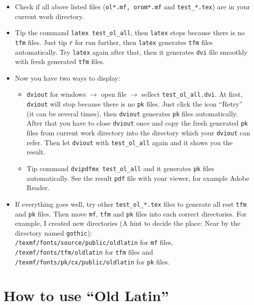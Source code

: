 \documentclass[a4paper]{article}
\begin{document}
\begin{itemize}
\item
Check if all above listed files
(\texttt{ol*.mf, orom*.mf} and \texttt{test\_*.tex})
are in your current work directory.
\item
Tip the command \texttt{latex test\_ol\_all},
then \texttt{latex} stops because there is no \texttt{tfm} files.
Just tip \texttt{r} for run further,
then \texttt{latex} generates \texttt{tfm} files automatically.
Try \texttt{latex} again after that,
then it generates \texttt{dvi} file smoothly
with fresh generated \texttt{tfm} files.

\item
Now you have two ways to display:
 \begin{itemize}
 \item
 \texttt{dviout} for windows
 $\rightarrow$ open file
 $\rightarrow$ sellect \texttt{test\_ol\_all.dvi}.
 At first, \texttt{dviout} will stop because there is no \texttt{pk} files.
 Just click the icon ``Retry'' (it can be several times),
 then \texttt{dviout} generates \texttt{pk} files automatically.
 After that you have to close \texttt{dviout} once and
 copy the fresh generated \texttt{pk} files
 from current work directory
 into the directory which your \texttt{dviout} can refer.
 Then let \texttt{dviout} with \texttt{test\_ol\_all} again and
 it shows you the result.
 \item
 Tip command \texttt{dvipdfmx test\_ol\_all}
 and it generates \texttt{pk} files automatically.
 See the result \texttt{pdf} file with your viewer,
 for example Adobe Reader.
 \end{itemize}
\item
If everything goes well,
try other \texttt{test\_ol\_*.tex} files
to generate all rest \texttt{tfm} and \texttt{pk} files.
Then move \texttt{mf}, \texttt{tfm} and \texttt{pk} files
into each correct directories.
For example, I created new directories
(A hint to decide the place:
Near by the directory named \texttt{gothic}):\\
\texttt{/texmf/fonts/source/public/oldlatin} for \texttt{mf} files,\\
\texttt{/texmf/fonts/tfm/oldlatin} for \texttt{tfm} files and\\
\texttt{/texmf/fonts/pk/cx/public/oldlatin} for \texttt{pk} files.

\end{itemize}

\section{How to use ``Old Latin''}
\end{document}
